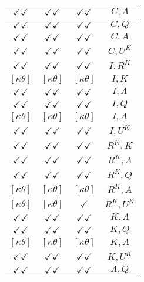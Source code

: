 \documentclass[a4paper,10pt]{article}
\begin{document}
\begin{longtable}{|c|c|c|c|}
\hline
$\checkmark\checkmark$ & $\checkmark\checkmark$ & $\checkmark\checkmark$ & ${C},{\Lambda}$ \\
\hline
$\checkmark\checkmark$ & $\checkmark\checkmark$ & $\checkmark\checkmark$ & ${C},{Q}$ \\
\hline
$\checkmark\checkmark$ & $\checkmark\checkmark$ & $\checkmark\checkmark$ & ${C},{A}$ \\
\hline
$\checkmark\checkmark$ & $\checkmark\checkmark$ & $\checkmark\checkmark$ & ${C},{U^K}$ \\
\hline
$\checkmark\checkmark$ & $\checkmark\checkmark$ & $\checkmark\checkmark$ & ${I},{R^{K}}$ \\
\hline
$[\kappa \theta ]$ & $[\kappa \theta ]$ & $[\kappa \theta ]$ & ${I},{K}$ \\
\hline
$\checkmark\checkmark$ & $\checkmark\checkmark$ & $\checkmark\checkmark$ & ${I},{\Lambda}$ \\
\hline
$\checkmark\checkmark$ & $\checkmark\checkmark$ & $\checkmark\checkmark$ & ${I},{Q}$ \\
\hline
$[\kappa \theta ]$ & $[\kappa \theta ]$ & $[\kappa \theta ]$ & ${I},{A}$ \\
\hline
$\checkmark\checkmark$ & $\checkmark\checkmark$ & $\checkmark\checkmark$ & ${I},{U^K}$ \\
\hline
$\checkmark\checkmark$ & $\checkmark\checkmark$ & $\checkmark\checkmark$ & ${R^{K}},{K}$ \\
\hline
$\checkmark\checkmark$ & $\checkmark\checkmark$ & $\checkmark\checkmark$ & ${R^{K}},{\Lambda}$ \\
\hline
$\checkmark\checkmark$ & $\checkmark\checkmark$ & $\checkmark\checkmark$ & ${R^{K}},{Q}$ \\
\hline
$[\kappa \theta ]$ & $[\kappa \theta ]$ & $[\kappa \theta ]$ & ${R^{K}},{A}$ \\
\hline
$[\kappa \theta ]$ & $[\kappa \theta ]$ & $\checkmark$ & ${R^{K}},{U^K}$ \\
\hline
$\checkmark\checkmark$ & $\checkmark\checkmark$ & $\checkmark\checkmark$ & ${K},{\Lambda}$ \\
\hline
$\checkmark\checkmark$ & $\checkmark\checkmark$ & $\checkmark\checkmark$ & ${K},{Q}$ \\
\hline
$[\kappa \theta ]$ & $[\kappa \theta ]$ & $[\kappa \theta ]$ & ${K},{A}$ \\
\hline
$\checkmark\checkmark$ & $\checkmark\checkmark$ & $\checkmark\checkmark$ & ${K},{U^K}$ \\
\hline
$\checkmark\checkmark$ & $\checkmark\checkmark$ & $\checkmark\checkmark$ & ${\Lambda},{Q}$ \\

\end{longtable}
\end{document}
